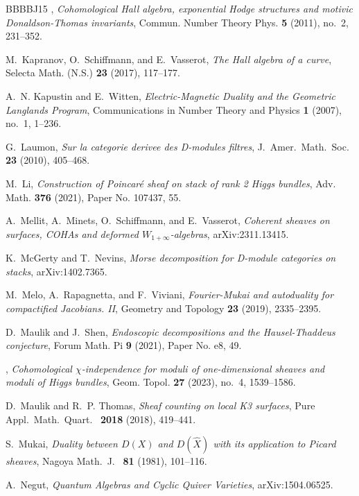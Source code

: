 \documentclass [11pt,oneside,a4paper,mathscr]{amsart}
\theoremstyle{definition}
\begin{document}
\begin{thebibliography}{BBBBJ15}
\bysame, \emph{Cohomological {H}all algebra, exponential {H}odge structures and motivic {D}onaldson-{T}homas invariants}, Commun. Number Theory Phys. \textbf{5} (2011), no.~2, 231--352.

M.~Kapranov, O.~Schiffmann, and E.~Vasserot, \emph{The {H}all algebra of a curve}, Selecta Math. (N.S.) \textbf{23} (2017), 117--177.

A.~N. Kapustin and E.~Witten, \emph{Electric-{M}agnetic {D}uality and the {G}eometric {L}anglands {P}rogram}, Communications in {N}umber {T}heory and {P}hysics \textbf{1} (2007), no.~1, 1--236.

G.~Laumon, \emph{Sur la categorie derivee des {D}-modules filtres}, J.~Amer.~Math.~Soc.~ \textbf{23} (2010), 405--468.

M.~Li, \emph{Construction of {P}oincar\'{e} sheaf on stack of rank 2 {H}iggs bundles}, Adv. Math. \textbf{376} (2021), Paper No. 107437, 55.

A.~Mellit, A.~Minets, O.~Schiffmann, and E.~Vasserot, \emph{Coherent sheaves on surfaces, {COHA}s and deformed ${W}_{1+\infty}$-algebras}, arXiv:2311.13415.

K.~McGerty and T.~Nevins, \emph{Morse decomposition for {D}-module categories on stacks}, arXiv:1402.7365.

M.~Melo, A.~Rapagnetta, and F.~Viviani, \emph{Fourier-{M}ukai and autoduality for compactified {J}acobians. {II}}, Geometry and Topology \textbf{23} (2019), 2335--2395.

D.~Maulik and J.~Shen, \emph{Endoscopic decompositions and the {H}ausel-{T}haddeus conjecture}, Forum Math. Pi \textbf{9} (2021), Paper No. e8, 49.

\bysame, \emph{Cohomological {$\chi$}-independence for moduli of one-dimensional sheaves and moduli of {H}iggs bundles}, Geom. Topol. \textbf{27} (2023), no.~4, 1539--1586.

D.~Maulik and R.~P. Thomas, \emph{Sheaf counting on local {K}3 surfaces}, Pure Appl.~Math.~Quart.~ \textbf{2018} (2018), 419--441.

S.~Mukai, \emph{Duality between ${D}({X})$ and ${D}(\hat{X})$ with its application to {P}icard sheaves}, Nagoya Math.~J.~ \textbf{81} (1981), 101--116.

A.~Negut, \emph{Quantum {A}lgebras and {C}yclic {Q}uiver {V}arieties}, arXiv:1504.06525.


\end{thebibliography}
\end{document}

